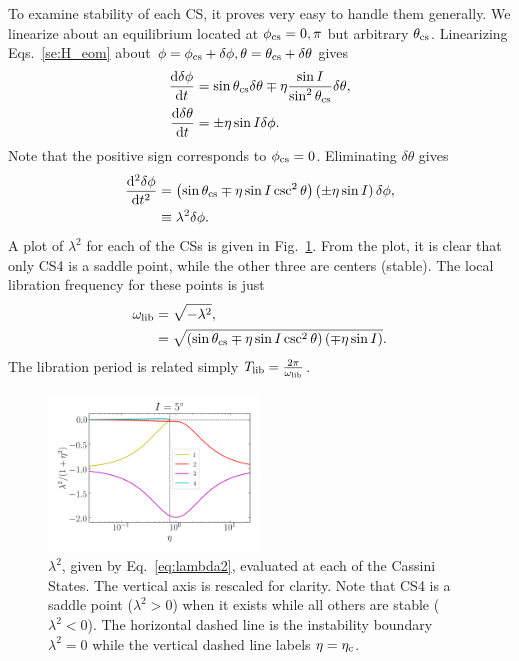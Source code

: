 \documentclass[
        fleqn,
        usenatbib,
    ]{mnras}
\newcommand*{\rd}[2]{\frac{\mathrm{d}#1}{\mathrm{d}#2}}
\newcommand*{\rtd}[2]{\frac{\mathrm{d}^2#1}{\mathrm{d}#2^2}}
\newcommand*{\p}[1]{\left(#1\right)}
\begin{document}
To examine stability of each CS, it proves very easy to handle them generally.
We linearize about an equilibrium located at $\phi_{\rm cs} = 0, \pi$ but
arbitrary $\theta_{\rm cs}$. Linearizing Eqs.~\eqref{se:H_eom} about $\phi =
\phi_{\rm cs} + \delta \phi, \theta = \theta_{\rm cs} + \delta \theta$ gives
\begin{subequations}\label{se:H_eom_lin}
    \begin{align}
        \rd{\delta \phi}{t} &= \sin \theta_{\rm cs} \delta \theta
            \mp \eta \frac{\sin I}{\sin^2\theta_{\rm cs}} \delta \theta,\\
        \rd{\delta \theta}{t} &= \pm \eta \sin I \delta \phi.
    \end{align}
\end{subequations}
Note that the positive sign corresponds to $\phi_{\rm cs} = 0$. Eliminating
$\delta \theta$ gives
\begin{align}
    \rtd{\delta \phi}{t} &= \p{\sin \theta_{\rm cs}
        \mp \eta \sin I\csc^2\theta}\p{\pm \eta \sin I} \delta
            \phi,\\
        &\equiv \lambda^2\delta \phi.\label{eq:lambda2}
\end{align}
A plot of $\lambda^2$ for each of the CSs is given in Fig.~\ref{fig:lambda2}.
From the plot, it is clear that only CS4 is a saddle point, while the other
three are centers (stable). The local libration frequency for these points is
just
\begin{align}
    \omega_{\rm lib} &= \sqrt{-\lambda^2},\\
        &= \sqrt{\p{\sin \theta_{\rm cs}
            \mp \eta \sin I \csc^2\theta}\p{\mp \eta \sin I}}.
\end{align}
The libration period is related simply $T_{\rm lib} = \frac{2\pi}{\omega_{\rm
lib}}$.
\begin{figure}
    \centering
    \includegraphics[width=0.5\textwidth]{plots_diskdisp/2_lambdas.png}
    \caption{$\lambda^2$, given by Eq.~\eqref{eq:lambda2}, evaluated at each of
    the Cassini States. The vertical axis is rescaled for clarity. Note that CS4
    is a saddle point ($\lambda^2 > 0$) when it exists while all others are
    stable ($\lambda^2 < 0$). The horizontal dashed line is the instability
    boundary $\lambda^2 = 0$ while the vertical dashed line labels $\eta =
    \eta_{\rm c}$.}\label{fig:lambda2}
\end{figure}
\end{document}
